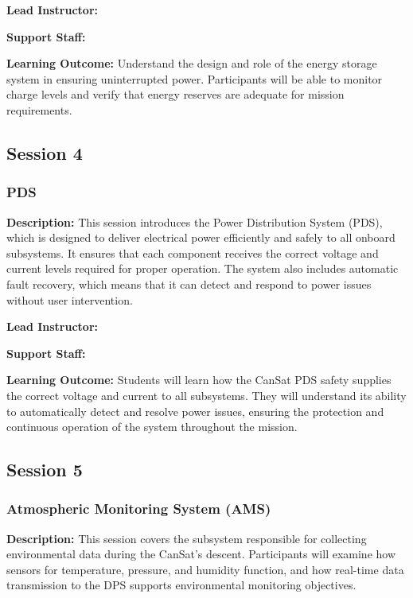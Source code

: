 \documentclass[a4paper,12pt]{article}
\begin{document}
\textbf{Lead Instructor:}

\textbf{Support Staff: }

\textbf{Learning Outcome:} Understand the design and role of the energy storage system in ensuring uninterrupted power. Participants will be able to monitor charge levels and verify that energy reserves are adequate for mission requirements.

\newpage

\subsection{Session 4}
\subsubsection{PDS}

\textbf{Description:} This session introduces the Power Distribution System (PDS), which is designed to deliver electrical power efficiently and safely to all onboard subsystems. It ensures that each component receives the correct voltage and current levels required for proper operation. The system also includes automatic fault recovery, which means that it can detect and respond to power issues without user intervention. 

\textbf{Lead Instructor:}

\textbf{Support Staff: }

\textbf{Learning Outcome:} Students will learn how the CanSat PDS safety supplies the correct voltage and current to all subsystems. They will understand its ability to automatically detect and resolve power issues, ensuring the protection and continuous operation of the system throughout the mission.

\newpage

\subsection{Session 5}
\subsubsection{Atmospheric Monitoring System (AMS)}

\textbf{Description:} This session covers the subsystem responsible for collecting environmental data during the CanSat's descent. Participants will examine how sensors for temperature, pressure, and humidity function, and how real-time data transmission to the DPS supports environmental monitoring objectives.
\end{document}
